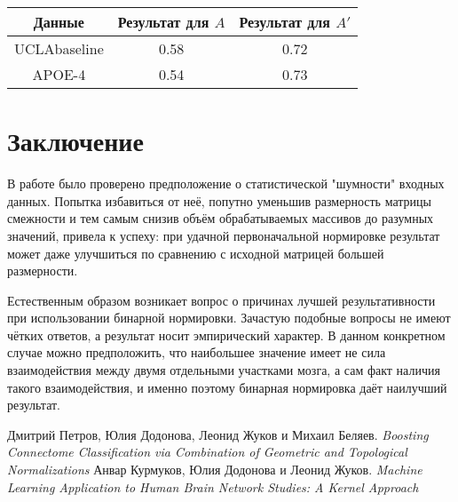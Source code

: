 \documentclass{urticle}
\newcommand{\mys}[1]{\newpage\section*{#1}}
\begin{document}
\begin{center}
\begin{tabular}[t]{|c|c|c|}
\hline
	Данные & Результат для $A$ & Результат для $A'$ \\
\hline
	UCLAbaseline & 0.58 & 0.72 \\
\hline
	APOE-4 & 0.54 & 0.73 \\
\hline
\end{tabular}
\end{center}

\mys{Заключение}
В работе было проверено предположение о статистической "шумности" входных данных. Попытка избавиться от неё, попутно уменьшив размерность матрицы смежности и тем самым снизив объём обрабатываемых массивов до разумных значений, привела к успеху: при удачной первоначальной нормировке результат может даже улучшиться по сравнению с исходной матрицей большей размерности.

Естественным образом возникает вопрос о причинах лучшей результативности при использовании бинарной нормировки. Зачастую подобные вопросы не имеют чётких ответов, а результат носит эмпирический характер. В данном конкретном случае можно предположить,  что наибольшее значение имеет не сила взаимодействия между двумя отдельными участками мозга, а сам факт наличия такого взаимодействия, и именно поэтому бинарная нормировка даёт наилучший результат.

\begin{thebibliography}{2}
  Дмитрий Петров, Юлия Додонова, Леонид Жуков и Михаил Беляев. \textit{Boosting Connectome Classification via Combination of Geometric and Topological Normalizations}
  Анвар Курмуков, Юлия Додонова и Леонид Жуков. \textit{Machine Learning Application to Human Brain Network Studies: A Kernel Approach}
\end{thebibliography}
\end{document}
